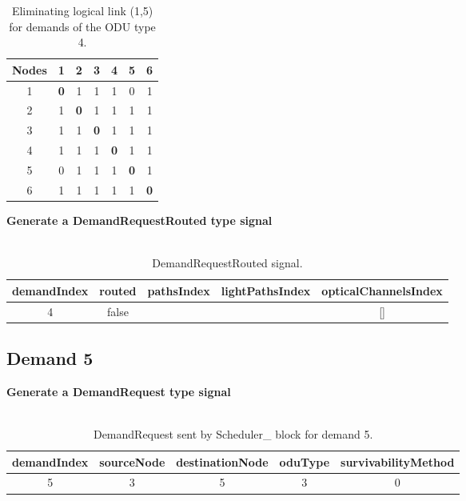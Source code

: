 \begin{table}[H]
	\centering	
	\begin{tabular}{|c|c|c|c|c|c|c|}
		\hline
		\multicolumn{1}{|l|}{\textbf{Nodes}} & 1   & 2   & 3   & 4   & 5   & 6  \\ \hline
		1                           & \textbf{0}   & 1 & 1 & 1 & 0 & 1 \\ \hline
		2                           & 1 & \textbf{0}   & 1 & 1 & 1 & 1 \\ \hline
		3                           & 1 & 1 & \textbf{0}   & 1 & 1 & 1 \\ \hline
		4                           & 1 & 1 & 1 & \textbf{0}   & 1 & 1 \\ \hline
		5                           & 0 & 1 & 1 & 1 & \textbf{0}   & 1 \\ \hline
		6                           & 1 & 1 & 1 & 1 & 1 & \textbf{0}   \\ \hline
	\end{tabular}
	\caption{Eliminating logical link (1,5) for demands of the ODU type 4.}
	\label{Transparentlogical_topology}
\end{table}

\textbf{Generate a DemandRequestRouted type signal}\\ \\

\begin{table}[H]
	\centering
	\begin{tabular}{|c|c|c|c|c|}
		\hline
		demandIndex & routed & pathsIndex & lightPathsIndex & opticalChannelsIndex \\ \hline
		4           & false   &           &                & {[}{]}           \\ \hline
	\end{tabular}
	\caption{DemandRequestRouted signal.}
\end{table}

\subsection{Demand 5}
\textbf{Generate a DemandRequest type signal}\\ \\

\begin{table}[H]
	\centering
	\begin{tabular}{|c|c|c|c|c|}
		\hline
		demandIndex & sourceNode & destinationNode & oduType & survivabilityMethod \\ \hline
		5           & 3          & 5               & 3       & 0                   \\ \hline
	\end{tabular}
	\caption{DemandRequest sent by Scheduler\_  block for demand 5.}
\end{table}

